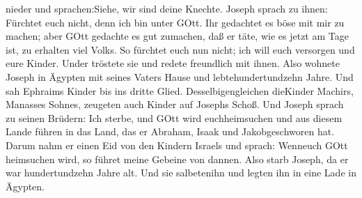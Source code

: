 nieder und sprachen:Siehe, wir sind deine Knechte.  Joseph
sprach zu ihnen: Fürchtet euch nicht, denn ich bin unter GOtt.
 Ihr gedachtet es böse mit mir zu machen; aber GOtt
gedachte es gut zumachen, daß er täte, wie es jetzt am Tage ist, zu
erhalten viel Volks.  So fürchtet euch nun nicht; ich will
euch versorgen und eure Kinder. Under tröstete sie und redete freundlich
mit ihnen.  Also wohnete Joseph in Ägypten mit seines
Vaters Hause und lebtehundertundzehn Jahre.  Und sah
Ephraims Kinder bis ins dritte Glied. Desselbigengleichen dieKinder
Machirs, Manasses Sohnes, zeugeten auch Kinder auf Josephs Schoß.
 Und Joseph sprach zu seinen Brüdern: Ich sterbe, und GOtt
wird euchheimsuchen und aus diesem Lande führen in das Land, das er
Abraham, Isaak und Jakobgeschworen hat.  Darum nahm er
einen Eid von den Kindern Israels und sprach: Wenneuch GOtt heimsuchen
wird, so führet meine Gebeine von dannen.  Also starb
Joseph, da er war hundertundzehn Jahre alt. Und sie salbetenihn und
legten ihn in eine Lade in Ägypten.
